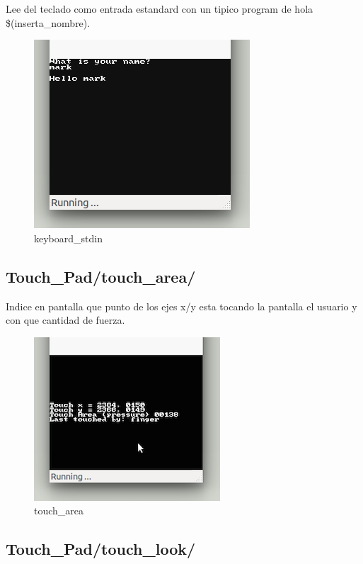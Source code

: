 \documentclass[12pt,english]{article}
\begin{document}
    Lee del teclado como entrada estandard con un tipico program de hola \$(inserta\_nombre).

    \begin{figure}[H] 
    \centering
    \includegraphics[scale=0.5]{images/keyboard_stdin}
    \caption{keyboard\_stdin}
    \end{figure}

    \subsection{Touch\_Pad/touch\_area/}

    Indice en pantalla que punto de los ejes x/y esta tocando la pantalla el usuario y con que cantidad de fuerza.

    \begin{figure}[H] 
    \centering
    \includegraphics[scale=0.5]{images/touch_area}
    \caption{touch\_area}
    \end{figure}

    \newpage

    \subsection{Touch\_Pad/touch\_look/}
\end{document}
